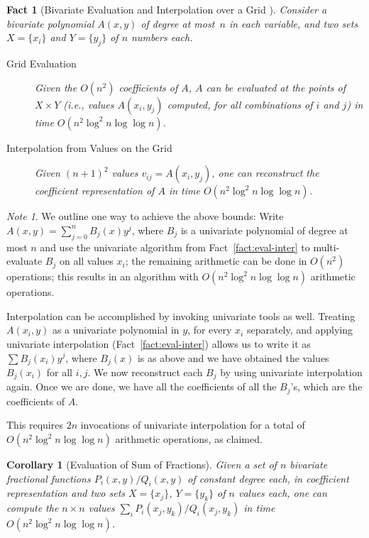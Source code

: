\documentclass[11pt]{article}
\newtheorem{corollary}[theorem]{Corollary}
\newtheorem{fact}[theorem]{Fact}
\theoremstyle{remark}
\newtheorem*{note}{Note}
\begin{document}
\begin{fact}[Bivariate Evaluation and Interpolation over a Grid \cite{p-smpm-94,bp-pmcfa-94}]
  \label{fact:bi:eval-inter-grid}
  Consider a bivariate polynomial $A(x,y)$ of degree at most~$n$ in
  each variable, and two sets $X=\{x_i\}$ and $Y=\{y_j\}$ of $n$
  numbers each.
  \begin{description}
  \item[Grid Evaluation]
    Given the $O(n^2)$ coefficients of $A$, $A$ can be evaluated at the
    points of $X\times Y$ (i.e., values $A(x_i,y_j)$ computed, for all
    combinations of $i$ and $j$) in time $O(n^2 \log^2 n \log \log n)$.
\item[Interpolation from Values on the Grid]
    Given $(n+1)^2$ values $v_{ij}=A(x_i,y_j)$, one can reconstruct the
    coefficient representation of $A$ in time $O(n^2 \log^2 n \log \log n)$.
  \end{description}
\end{fact}

\begin{note}
  We outline one way to achieve the above bounds: Write $A(x,y)=\sum_{j=0}^{n}B_j(x)y^j$, where $B_j$ is a
  univariate polynomial of degree at most $n$ and use the
  univariate algorithm from Fact~\ref{fact:eval-inter} to
  multi-evaluate $B_j$ on all values $x_i$; the remaining arithmetic
  can be done in $O(n^2)$ operations; this results in an algorithm with $O(n^2 \log^2 n \log \log n)$ arithmetic operations.


  Interpolation can be accomplished by invoking univariate tools as well.  Treating $A(x_i,y)$ as a univariate polynomial in $y$, for every $x_i$ separately, and applying univariate interpolation (Fact~\ref{fact:eval-inter}) allows us to write it as $\sum B_j(x_i)y^j$, where $B_j(x)$ is as above and we have obtained the values $B_j(x_i)$ for all $i,j$. We now reconstruct each $B_j$ by using univariate interpolation again.  Once we are done, we have all the coefficients of all the $B_j$'s, which are the coefficients of $A$.

  This requires $2n$ invocations of univariate interpolation for a total of $O(n^2 \log^2 n \log \log n)$ arithmetic operations, as claimed.



\end{note}

\begin{corollary}[Evaluation of Sum of Fractions]
  \label{cor:eval-sum-fractions-bi}
  Given a set of $n$ bivariate fractional functions
  $P_i(x,y)/Q_i(x,y)$ of constant degree each, in coefficient
  representation and two sets $X=\{x_j\}$, $Y=\{y_k\}$ of $n$ values
  each, one can compute the $n\times n$ values $\sum_i
  P_i(x_j,y_k)/Q_i(x_j,y_k)$ in time $O(n^2 \log^2 n \log \log n)$.
\end{corollary}
\end{document}
